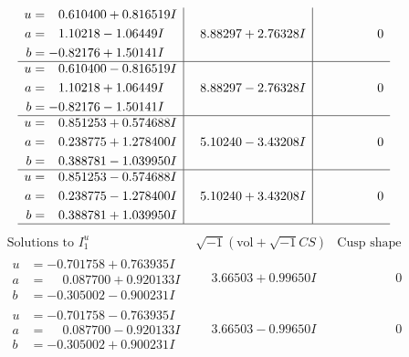 \documentclass[1p]{elsarticle_modified}
\theoremstyle{definition}
\newcommand{\I}{\sqrt{-1}}
\begin{document}
$$\begin{array}{c|c|c}
\begin{aligned}
u &= \phantom{-}0.610400 + 0.816519 I \\
a &= \phantom{-}1.10218 - 1.06449 I \\
b &= -0.82176 + 1.50141 I\end{aligned}
 & \phantom{-}8.88297 + 2.76328 I & \phantom{-0.000000 } 0 \\ \hline\begin{aligned}
u &= \phantom{-}0.610400 - 0.816519 I \\
a &= \phantom{-}1.10218 + 1.06449 I \\
b &= -0.82176 - 1.50141 I\end{aligned}
 & \phantom{-}8.88297 - 2.76328 I & \phantom{-0.000000 } 0 \\ \hline\begin{aligned}
u &= \phantom{-}0.851253 + 0.574688 I \\
a &= \phantom{-}0.238775 + 1.278400 I \\
b &= \phantom{-}0.388781 - 1.039950 I\end{aligned}
 & \phantom{-}5.10240 - 3.43208 I & \phantom{-0.000000 } 0 \\ \hline\begin{aligned}
u &= \phantom{-}0.851253 - 0.574688 I \\
a &= \phantom{-}0.238775 - 1.278400 I \\
b &= \phantom{-}0.388781 + 1.039950 I\end{aligned}
 & \phantom{-}5.10240 + 3.43208 I & \phantom{-0.000000 } 0\\
 \hline 
 \end{array}$$\newpage$$\begin{array}{c|c|c}  
\text{Solutions to }I^u_{1}& \I (\text{vol} + \sqrt{-1}CS) & \text{Cusp shape}\\
 \hline 
\begin{aligned}
u &= -0.701758 + 0.763935 I \\
a &= \phantom{-}0.087700 + 0.920133 I \\
b &= -0.305002 - 0.900231 I\end{aligned}
 & \phantom{-}3.66503 + 0.99650 I & \phantom{-0.000000 } 0 \\ \hline\begin{aligned}
u &= -0.701758 - 0.763935 I \\
a &= \phantom{-}0.087700 - 0.920133 I \\
b &= -0.305002 + 0.900231 I\end{aligned}
 & \phantom{-}3.66503 - 0.99650 I & \phantom{-0.000000 } 0 \\ \hline\begin{aligned}

\end{aligned}
\end{array}$$
\end{document}
